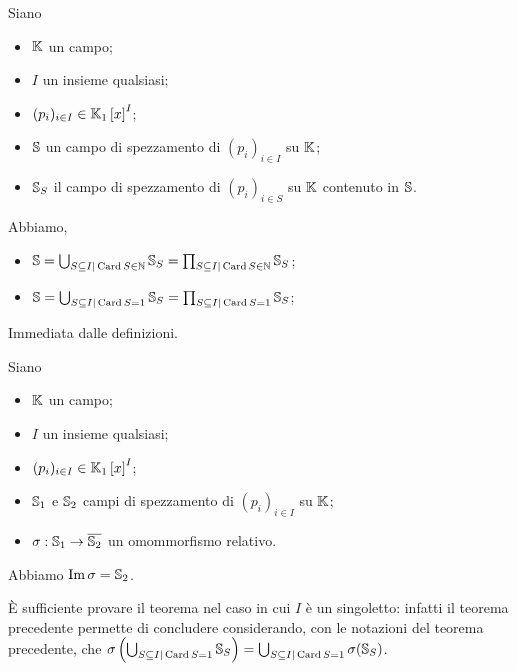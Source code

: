 \begin{Theorem}
	Siano
	\begin{itemize}
		\item $\mathbb{K}$ un campo;
		\item $I$ un insieme qualsiasi;
		\item $(p_i)_{i \in I} \in \mathbb{K}_1 \left [ x \right ]^I$;
		\item $\mathbb{S}$ un campo di spezzamento di $(p_i)_{i \in I}$ su $\mathbb{K}$;
		\item $\mathbb{S}_S$ il campo di spezzamento di $(p_i)_{i \in S}$ su $\mathbb{K}$ contenuto in $\mathbb{S}$.
	\end{itemize}
	Abbiamo,
	\begin{itemize}
		\item $\mathbb{S} = \bigcup_{S \subseteq I | \operatorname{Card}{S} \in \mathbb{N}} \mathbb{S}_S = \prod_{S \subseteq I | \operatorname{Card}{S} \in \mathbb{N}} \mathbb{S}_S$;
		\item $\mathbb{S} = \bigcup_{S \subseteq I | \operatorname{Card}{S} = 1} \mathbb{S}_S = \prod_{S \subseteq I | \operatorname{Card}{S} = 1} \mathbb{S}_S$;
	\end{itemize}
\end{Theorem}
\Proof Immediata dalle definizioni. \EndProof
\begin{Theorem}\label{th_pre_unicitacampospezzamento}
	Siano
	\begin{itemize}
		\item $\mathbb{K}$ un campo;
		\item $I$ un insieme qualsiasi;
		\item $(p_i)_{i \in I} \in \mathbb{K}_1 \left [ x \right ]^I$;
		\item $\mathbb{S}_1$ e $\mathbb{S}_2$ campi di spezzamento di $(p_i)_{i \in I}$ su $\mathbb{K}$;
		\item $\sigma: \mathbb{S}_1 \rightarrow \overline{\mathbb{S}_2}$ un omommorfismo relativo.
	\end{itemize}
	Abbiamo $\operatorname{Im} \sigma = \mathbb{S}_2$.
\end{Theorem}
\Proof \`E sufficiente provare il teorema nel caso in cui $I$ \`e un singoletto: infatti il teorema precedente permette di concludere considerando, con le notazioni del teorema precedente, che $\sigma \left ( \bigcup_{S \subseteq I | \operatorname{Card}{S} = 1} \mathbb{S}_S \right ) = \bigcup_{S \subseteq I | \operatorname{Card}{S} = 1} \sigma(\mathbb{S}_S)$.
